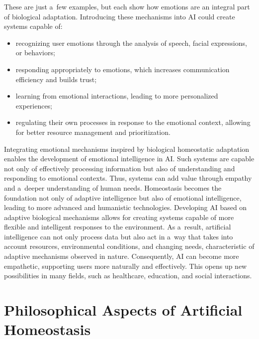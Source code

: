 \documentclass[%
  manuscript=article,
  year=2024,
  volume=77,
  doi=00000.000,
]{zfn}
\begin{document}
These are just a~few examples, but each show how emotions are an integral part of biological adaptation. Introducing these mechanisms into AI could create systems capable of:



\begin{itemize}

\item recognizing user emotions through the analysis of speech, facial expressions, or behaviors;~

\item responding appropriately to emotions, which increases communication efficiency and builds trust;~

\item learning from emotional interactions, leading to more personalized experiences;~

\item regulating their own processes in response to the emotional context, allowing for better resource management and prioritization.

\end{itemize}

Integrating emotional mechanisms inspired by biological homeostatic adaptation enables the development of emotional intelligence in AI. Such systems are capable not only of effectively processing information but also of understanding and responding to emotional contexts. Thus, systems can add value through empathy and a~deeper understanding of human needs. Homeostasis becomes the foundation not only of adaptive intelligence but also of emotional intelligence, leading to more advanced and humanistic technologies. Developing AI based on adaptive biological mechanisms allows for creating systems capable of more flexible and intelligent responses to the environment. As a~result, artificial intelligence can not only process data but also act in a~way that takes into account resources, environmental conditions, and changing needs, characteristic of adaptive mechanisms observed in nature. Consequently, AI can become more empathetic, supporting users more naturally and effectively. This opens up new possibilities in many fields, such as healthcare, education, and social interactions.



\section*{Philosophical Aspects of Artificial Homeostasis}
\end{document}
